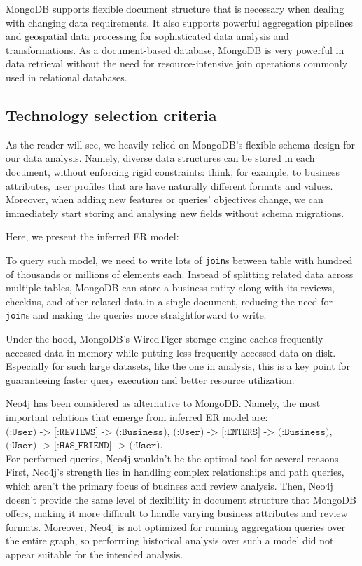 \documentclass{Configuration_Files/PoliMi3i_thesis}
\begin{document}
MongoDB supports flexible document structure that is necessary when dealing with changing data requirements. It also supports powerful aggregation pipelines and geospatial data processing for sophisticated data analysis and transformations. As a document-based database, MongoDB is very powerful in data retrieval without the need for resource-intensive join operations commonly used in relational databases.

\subsection{Technology selection criteria}
As the reader will see, we heavily relied on MongoDB's flexible schema design for our data analysis. Namely, diverse data structures can be stored in each document, without enforcing rigid constraints: think, for example, to business attributes, user profiles that are have naturally different formats and values. Moreover, when adding new features or queries' objectives change, we can immediately start storing and analysing new fields without schema migrations.

Here, we present the inferred ER model:

To query such model, we need to write lots of \texttt{join}s between table with hundred of thousands or millions of elements each. Instead of splitting related data across multiple tables, MongoDB can store a business entity along with its reviews, checkins, and other related data in a single document, reducing the need for \texttt{join}s and making the queries more straightforward to write. 

Under the hood, MongoDB's WiredTiger storage engine caches frequently accessed data in memory while putting less frequently accessed data on disk. Especially for such large datasets, like the one in analysis, this is a key point for guaranteeing faster query execution and better resource utilization.


Neo4j has been considered as alternative to MongoDB. Namely, the most important relations that emerge from inferred ER model are: $\texttt{(:User) -> [:REVIEWS] -> (:Business)}$,  $\texttt{(:User) -> [:ENTERS] -> (:Business)}$,  $\texttt{(:User) -> [:HAS\_FRIEND] -> (:User)}$. \\ For performed queries, Neo4j wouldn't be the optimal tool for several reasons. First, Neo4j's strength lies in handling complex relationships and path queries, which aren't the primary focus of business and review analysis. Then, Neo4j doesn't provide the same level of flexibility in document structure that MongoDB offers, making it more difficult to handle varying business attributes and review formats. Moreover, Neo4j is not optimized for running aggregation
queries over the entire graph, so performing historical analysis over such a model did not appear suitable for the intended analysis.
\end{document}
